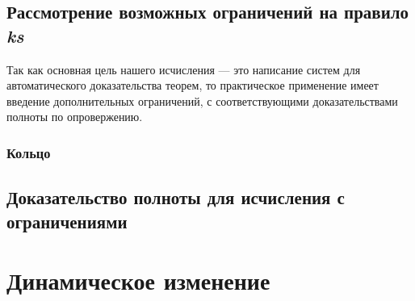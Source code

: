 \subsection{Рассмотрение возможных ограничений на правило \emph{ks}}
\label{sec:restr}

Так как основная цель нашего исчисления --- это написание систем для автоматического доказательства теорем, то практическое применение имеет введение дополнительных ограничений, с соответствующими доказательствами полноты по опровержению.

\subsubsection{Кольцо}

\subsection{Доказательство полноты для исчисления с ограничениями}

\section{Динамическое изменение}
\label{sec:onlineChanging}